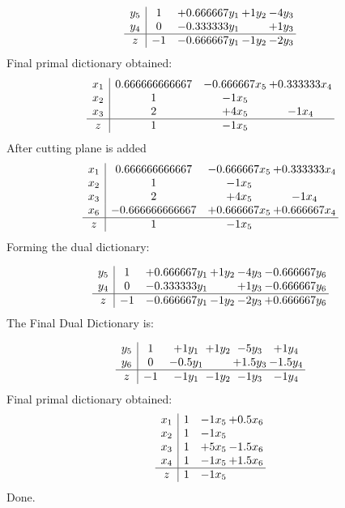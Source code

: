 \documentclass[11pt]{article}
\begin{document}
\[\begin{array}{c| c c@{\hskip 2pt} c@{\hskip 2pt} c@{\hskip 2pt} }
 y_{5}   &  1 & + 0.666667 y_{1} & + 1 y_{2} & -4 y_{3}\\
 y_{4}   &  0 & -0.333333 y_{1} &   & + 1 y_{3}\\
\hline
z    &  -1 & -0.666667 y_{1} & -1 y_{2} & -2 y_{3}\\
\end{array}\]
 Final primal dictionary obtained: 
\[\begin{array}{c| c c@{\hskip 2pt} c@{\hskip 2pt} }
 x_{1}   &  0.666666666667 & -0.666667 x_{5} & + 0.333333 x_{4}\\
 x_{2}   &  1 & -1 x_{5} &   \\
 x_{3}   &  2 & + 4 x_{5} & -1 x_{4}\\
\hline
z    &  1 & -1 x_{5} &   \\
\end{array}\]
 After cutting plane is added 
\[\begin{array}{c| c c@{\hskip 2pt} c@{\hskip 2pt} }
 x_{1}   &  0.666666666667 & -0.666667 x_{5} & + 0.333333 x_{4}\\
 x_{2}   &  1 & -1 x_{5} &   \\
 x_{3}   &  2 & + 4 x_{5} & -1 x_{4}\\
 x_{6}   &  -0.666666666667 & + 0.666667 x_{5} & + 0.666667 x_{4}\\
\hline
z    &  1 & -1 x_{5} &   \\
\end{array}\]
Forming the dual dictionary:

\[\begin{array}{c| c c@{\hskip 2pt} c@{\hskip 2pt} c@{\hskip 2pt} c@{\hskip 2pt} }
 y_{5}   &  1 & + 0.666667 y_{1} & + 1 y_{2} & -4 y_{3} & -0.666667 y_{6}\\
 y_{4}   &  0 & -0.333333 y_{1} &   & + 1 y_{3} & -0.666667 y_{6}\\
\hline
z    &  -1 & -0.666667 y_{1} & -1 y_{2} & -2 y_{3} & + 0.666667 y_{6}\\
\end{array}\]
The Final Dual Dictionary is: 

\[\begin{array}{c| c c@{\hskip 2pt} c@{\hskip 2pt} c@{\hskip 2pt} c@{\hskip 2pt} }
 y_{5}   &  1 & + 1 y_{1} & + 1 y_{2} & -5 y_{3} & + 1 y_{4}\\
 y_{6}   &  0 & -0.5 y_{1} &   & + 1.5 y_{3} & -1.5 y_{4}\\
\hline
z    &  -1 & -1 y_{1} & -1 y_{2} & -1 y_{3} & -1 y_{4}\\
\end{array}\]
 Final primal dictionary obtained: 
\[\begin{array}{c| c c@{\hskip 2pt} c@{\hskip 2pt} }
 x_{1}   &  1 & -1 x_{5} & + 0.5 x_{6}\\
 x_{2}   &  1 & -1 x_{5} &   \\
 x_{3}   &  1 & + 5 x_{5} & -1.5 x_{6}\\
 x_{4}   &  1 & -1 x_{5} & + 1.5 x_{6}\\
\hline
z    &  1 & -1 x_{5} &   \\
\end{array}\]
Done.
\end{document}
